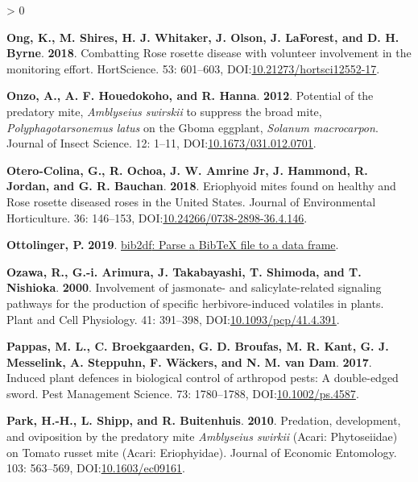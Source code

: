 \documentclass{ufdissertation}[overrideChapters] %
\newlength{\cslhangindent}
\newenvironment{CSLReferences}[2] %
 {%
  \setlength{\parindent}{0pt}
  \ifodd #1 \everypar{\setlength{\hangindent}{\cslhangindent}}\ignorespaces\fi
  \ifnum #2 > 0
  \setlength{\parskip}{#2\baselineskip}
  \fi
 }%
 {}
\begin{document}
{\begin{CSLReferences}{1}{1}
\leavevmode{}%
\textbf{Ong, K., M. Shires, H. J. Whitaker, J. Olson, J. LaForest, and D. H. Byrne}. \textbf{2018}. Combatting {Rose rosette disease} with volunteer involvement in the monitoring effort. {HortScience}. 53: 601--603, DOI:\href{https://doi.org/10.21273/hortsci12552-17}{10.21273/hortsci12552-17}.

\leavevmode{}%
\textbf{Onzo, A., A. F. Houedokoho, and R. Hanna}. \textbf{2012}. Potential of the predatory mite, {\emph{Amblyseius swirskii}} to suppress the broad mite, {\emph{Polyphagotarsonemus latus}} on the {Gboma eggplant}, {\emph{Solanum macrocarpon}}. Journal of Insect Science. 12: 1--11, DOI:\href{https://doi.org/10.1673/031.012.0701}{10.1673/031.012.0701}.

\leavevmode{}%
\textbf{Otero-Colina, G., R. Ochoa, J. W. Amrine Jr, J. Hammond, R. Jordan, and G. R. Bauchan}. \textbf{2018}. Eriophyoid mites found on healthy and {Rose rosette diseased} roses in the {United States}. Journal of Environmental Horticulture. 36: 146--153, DOI:\href{https://doi.org/10.24266/0738-2898-36.4.146}{10.24266/0738-2898-36.4.146}.

\leavevmode{}%
\textbf{Ottolinger, P.} \textbf{2019}. \href{https://CRAN.R-project.org/package=bib2df}{{bib2df}: Parse a {BibTeX} file to a data frame}.

\leavevmode{}%
\textbf{Ozawa, R., G.-i. Arimura, J. Takabayashi, T. Shimoda, and T. Nishioka}. \textbf{2000}. Involvement of jasmonate- and salicylate-related signaling pathways for the production of specific herbivore-induced volatiles in plants. Plant and Cell Physiology. 41: 391--398, DOI:\href{https://doi.org/10.1093/pcp/41.4.391}{10.1093/pcp/41.4.391}.

\leavevmode{}%
\textbf{Pappas, M. L., C. Broekgaarden, G. D. Broufas, M. R. Kant, G. J. Messelink, A. Steppuhn, F. Wäckers, and N. M. van Dam}. \textbf{2017}. Induced plant defences in biological control of arthropod pests: A double-edged sword. Pest Management Science. 73: 1780--1788, DOI:\href{https://doi.org/10.1002/ps.4587}{10.1002/ps.4587}.

\leavevmode{}%
\textbf{Park, H.-H., L. Shipp, and R. Buitenhuis}. \textbf{2010}. Predation, development, and oviposition by the predatory mite {\emph{Amblyseius swirkii}} ({Acari}: {Phytoseiidae}) on {Tomato russet mite} ({Acari}: {Eriophyidae}). Journal of Economic Entomology. 103: 563--569, DOI:\href{https://doi.org/10.1603/ec09161}{10.1603/ec09161}.


\end{CSLReferences}}
\end{document}
